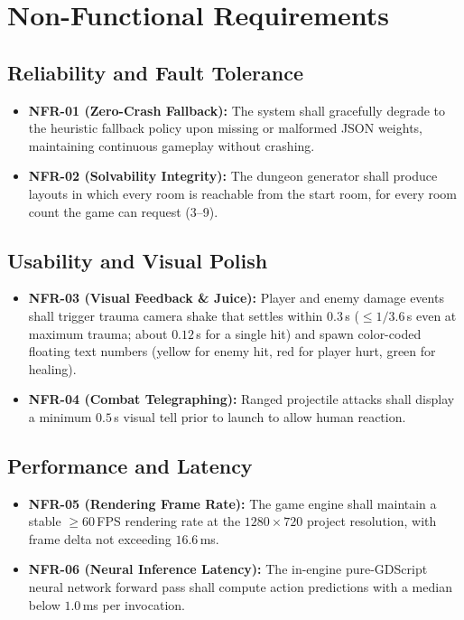 \section{Non-Functional Requirements}

\subsection{Reliability and Fault Tolerance}
\begin{itemize}
    \item \textbf{NFR-01 (Zero-Crash Fallback):} The system shall gracefully degrade to the heuristic fallback policy upon missing or malformed JSON weights, maintaining continuous gameplay without crashing.
    \item \textbf{NFR-02 (Solvability Integrity):} The dungeon generator shall produce layouts in which every room is reachable from the start room, for every room count the game can request (3--9).
\end{itemize}

\subsection{Usability and Visual Polish}
\begin{itemize}
    \item \textbf{NFR-03 (Visual Feedback \& Juice):} Player and enemy damage events shall trigger trauma camera shake that settles within $0.3$\,s ($\le 1/3.6$\,s even at maximum trauma; about $0.12$\,s for a single hit) and spawn color-coded floating text numbers (yellow for enemy hit, red for player hurt, green for healing).
    \item \textbf{NFR-04 (Combat Telegraphing):} Ranged projectile attacks shall display a minimum $0.5$\,s visual tell prior to launch to allow human reaction.
\end{itemize}

\subsection{Performance and Latency}
\begin{itemize}
    \item \textbf{NFR-05 (Rendering Frame Rate):} The game engine shall maintain a stable $\ge 60$\,FPS rendering rate at the $1280\times720$ project resolution, with frame delta not exceeding $16.6$\,ms.
    \item \textbf{NFR-06 (Neural Inference Latency):} The in-engine pure-GDScript neural network forward pass shall compute action predictions with a median below $1.0$\,ms per invocation.
\end{itemize}

